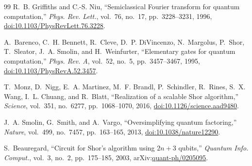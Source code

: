 \documentclass[11pt,a4paper,twocolumn]{article}
\begin{document}
\begin{thebibliography}{99}
R.~B. Griffiths and C.-S. Niu, ``Semiclassical Fourier transform for quantum computation,'' \emph{Phys. Rev. Lett.}, vol.~76, no.~17, pp.~3228--3231, 1996, \href{https://doi.org/10.1103/PhysRevLett.76.3228}{doi:10.1103/PhysRevLett.76.3228}.

A.~Barenco, C.~H. Bennett, R.~Cleve, D.~P. DiVincenzo, N.~Margolus, P.~Shor, T.~Sleator, J.~A. Smolin, and H.~Weinfurter, ``Elementary gates for quantum computation,'' \emph{Phys. Rev. A}, vol.~52, no.~5, pp.~3457--3467, 1995, \href{https://doi.org/10.1103/PhysRevA.52.3457}{doi:10.1103/PhysRevA.52.3457}.

T.~Monz, D.~Nigg, E.~A. Martinez, M.~F. Brandl, P.~Schindler, R.~Rines, S.~X. Wang, I.~L. Chuang, and R.~Blatt, ``Realization of a scalable Shor algorithm,'' \emph{Science}, vol.~351, no.~6277, pp.~1068--1070, 2016, \href{https://doi.org/10.1126/science.aad9480}{doi:10.1126/science.aad9480}.

J.~A. Smolin, G.~Smith, and A.~Vargo, ``Oversimplifying quantum factoring,'' \emph{Nature}, vol.~499, no.~7457, pp.~163--165, 2013, \href{https://doi.org/10.1038/nature12290}{doi:10.1038/nature12290}.

S.~Beauregard, ``Circuit for Shor's algorithm using $2n+3$ qubits,'' \emph{Quantum Info. Comput.}, vol.~3, no.~2, pp.~175--185, 2003, arXiv:\href{https://arxiv.org/abs/quant-ph/0205095}{quant-ph/0205095}.

\end{thebibliography}
\end{document}
